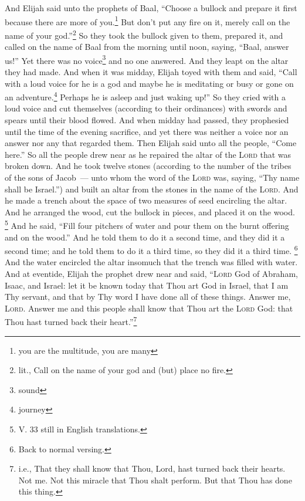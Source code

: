 \begin{enumerate*}[mode=unboxed]
     And Elijah said unto the prophets of Baal, ``Choose a bullock and prepare it first because there are more of you.\footnote{you are the multitude, you are many} But don't put any fire on it, merely call on the name of your god.''\footnote{lit., Call on the name of your god and (but) place no fire.}%
     So they took the bullock given to them, prepared it, and called on the name of Baal from the morning until noon, saying, ``Baal, answer us!'' Yet there was no voice\footnote{sound} and no one answered. And they leapt on the altar they had made.%
     And when it was midday, Elijah toyed with them and said, ``Call with a loud voice for he is a god and maybe he is meditating or busy or gone on an adventure.\footnote{journey} Perhaps he is asleep and just waking up!''%
     So they cried with a loud voice and cut themselves (according to their ordinances) with swords and spears until their blood flowed.%
     And when midday had passed, they prophesied until the time of the evening sacrifice, and yet there was neither a voice nor an answer nor any that regarded them.%
     Then Elijah said unto all the people, ``Come here.'' So all the people drew near as he repaired the altar of the \textsc{Lord} that was broken down.%
     And he took twelve stones (according to the number of the tribes of the sons of Jacob~--- unto whom the word of the \textsc{Lord} was, saying, ``Thy name shall be Israel.'')%
     and built an altar from the stones in the name of the \textsc{Lord}. And he made a trench about the space of two measures of seed encircling the altar.%
     And he arranged the wood, cut the bullock in pieces, and placed it on the wood.%
     \footnote{V. 33 still in English translations.} And he said, ``Fill four pitchers of water and pour them on the burnt offering and on the wood.'' And he told them to do it a second time, and they did it a second time; and he told them to do it a third time, so they did it a third time.%
     \footnote{Back to normal versing.} And the water encircled the altar insomuch that the trench was filled with water.%
     And at eventide, Elijah the prophet drew near and said, ``\textsc{Lord} God of Abraham, Isaac, and Israel: let it be known today that Thou art God in Israel, that I am Thy servant, and that by Thy word I have done all of these things.%
     Answer me, \textsc{Lord}. Answer me and this people shall know that Thou art the \textsc{Lord} God: that Thou hast turned back their heart.''\footnote{i.e., That they shall know that Thou, Lord, hast turned back their hearts. Not me. Not this miracle that Thou shalt perform. But that Thou has done this thing.}%

\end{enumerate*}
